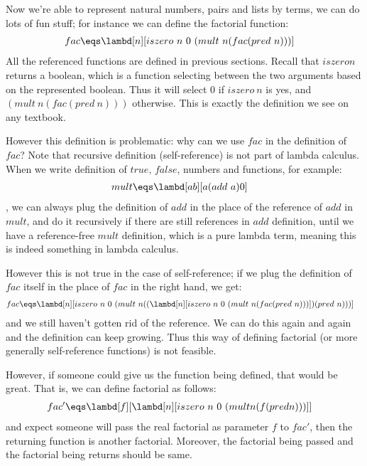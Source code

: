 \documentclass[../../../include/open-logic-section]{subfiles}
\begin{document}


Now we're able to represent natural numbers, pairs and
lists by terms, we can do lots of fun stuff; for instance we can
define the factorial function:
\begin{align*}
  fac &\eqs \lambd[n][iszero ~ n ~ 0 ~ (mult ~ n (fac (pred ~ n)))]
\end{align*}
All the referenced functions are defined in previous sections.
Recall that $iszero n$ returns a boolean, which is a function
selecting between the two arguments based on the represented boolean.
Thus it will select $0$ if $iszero ~ n$ is yes, and $(mult ~ n (fac
(pred ~ n)))$ otherwise. This is exactly the definition we see on any
textbook.

However this definition is problematic: why can we use $fac$ in the
definition of $fac$? Note that recursive definition (self-reference)
is not part of lambda calculus. When we write definition of $true$,
$false$, numbers and functions, for example:
\begin{align*}
    {mult} &\eqs \lambd[ab][a (add ~ a) 0]
\end{align*}
, we can always plug the definition of $add$ in the place of the
reference of $add$ in $mult$, and do it recursively if there are still
references in $add$ definition, until we have a reference-free $mult$ definition, which
is a pure lambda term, meaning this is indeed something in lambda calculus.

However this is not true in the case of self-reference; if we plug the
definition of $fac$ itself in the place of $fac$ in the right hand, we
get:
\begin{align*}
  fac &\eqs \lambd[n][iszero ~ n ~ 0 ~ (mult ~ n ((\lambd[n][iszero ~ n ~
  0 ~ (mult ~ n (fac (pred ~ n)))]) (pred ~ n)))]
\end{align*}
and we still haven't gotten rid of the reference. We can do this again
and again and the definition can keep growing. Thus this way of
defining factorial (or more generally self-reference functions) is not
feasible.

However, if someone could give us the function being defined, that
would be great. That is, we can define factorial as follows:
\begin{align*}
  fac' &\eqs \lambd[f][\lambd[n][iszero ~ n ~ 0 ~ (mult n (f (pred n)))]]
\end{align*}
and expect someone will pass the real factorial as parameter $f$ to $fac'$, then
the returning function is another factorial. Moreover, the factorial
being passed and the factorial being returns should be same.
\end{document}
